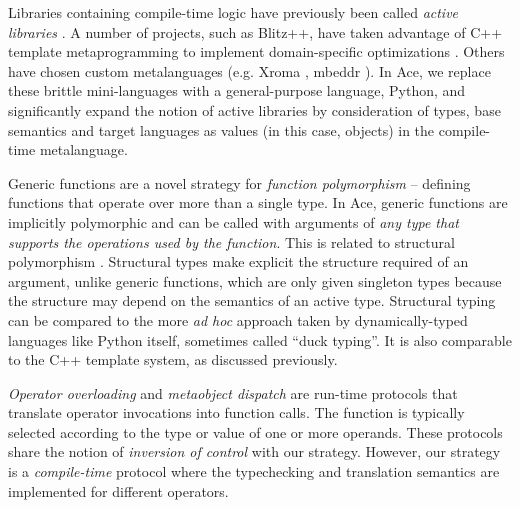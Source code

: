 \documentclass[10pt,preprint]{sigplanconf}
\begin{document}
{Libraries containing compile-time logic have previously been called {\it active libraries} \cite{activelibraries}. A number of  projects, such as Blitz++, have taken advantage of C++ template metaprogramming to implement domain-specific optimizations \cite{veldhuizen2000blitz++}. Others have chosen custom metalanguages (e.g. Xroma \cite{activelibraries}, mbeddr \cite{mbeddr}). In Ace, we replace these brittle mini-languages with a general-purpose language, Python, and significantly expand the notion of active libraries by consideration of types, base semantics and target languages as values (in this case, objects) in the compile-time metalanguage.

Generic functions are a novel strategy for {\it function polymorphism} -- defining functions that operate over more than a single type. In Ace, generic functions are implicitly polymorphic and can be called with arguments of {\it any type that supports the operations used by the function}. This is related to structural polymorphism \cite{malayeri2009structural}. Structural types make explicit the structure required of an argument, unlike generic functions, which are only given singleton types because the structure may depend on the semantics of an active type. 
Structural typing can be compared to the more \emph{ad hoc} approach taken by dynamically-typed languages like Python itself, sometimes called ``duck typing''. It is also comparable to the C++ template system, as discussed previously. 

{\it Operator overloading} \cite{vanWijngaarden:Mailloux:Peck:Koster:Sintzoff:Lindsey:Meertens:Fisker:acta:1975} and {\it metaobject dispatch} \cite{Kiczales91} are run-time protocols that translate operator invocations into function calls. The function is typically selected according to the type or value of one or more operands. These protocols share the notion of {\it inversion of control} with our strategy. However, our strategy is a {\it compile-time} protocol where the typechecking and translation semantics are implemented for different operators. %

}
\end{document}
